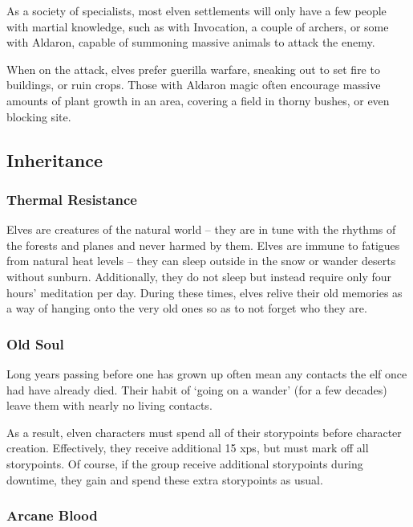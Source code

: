 \begin{multicols}{2}
As a society of specialists, most elven settlements will only have a few people with martial knowledge, such as  with Invocation, a couple of archers, or some with Aldaron, capable of summoning massive animals to attack the enemy.

When on the attack, elves prefer guerilla warfare, sneaking out to set fire to buildings, or ruin crops.
Those with Aldaron magic often encourage massive amounts of plant growth in an area, covering a field in thorny bushes, or even blocking site.

\subsection{Inheritance}

\subsubsection{Thermal Resistance}

Elves are creatures of the natural world -- they are in tune with the rhythms of the forests and planes and never harmed by them.
Elves are immune to \glspl{fatigue} from natural heat levels -- they can sleep outside in the snow or wander deserts without sunburn.
Additionally, they do not sleep but instead require only four hours' meditation per day.
During these times, elves relive their old memories as a way of hanging onto the very old ones so as to not forget who they are.

\subsubsection{Old Soul}

Long years passing before one has grown up often mean any contacts the elf once had have already died.
Their habit of `going on a wander' (for a few decades) leave them with nearly no living contacts.

As a result, elven characters must spend all of their \glspl{storypoint} before character creation.
Effectively, they receive additional 15 \glspl{xp}, but must mark off all \glspl{storypoint}.
Of course, if the group receive additional \glspl{storypoint} during \gls{downtime}, they gain and spend these extra \glspl{storypoint} as usual.

\subsubsection{Arcane Blood}


\end{multicols}
